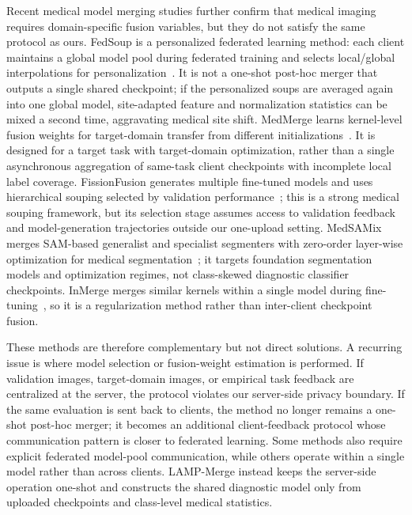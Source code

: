 Recent medical model merging studies further confirm that medical imaging requires domain-specific fusion variables, but they do not satisfy the same protocol as ours. FedSoup is a personalized federated learning method: each client maintains a global model pool during federated training and selects local/global interpolations for personalization~\cite{chen2023fedsoup}. It is not a one-shot post-hoc merger that outputs a single shared checkpoint; if the personalized soups are averaged again into one global model, site-adapted feature and normalization statistics can be mixed a second time, aggravating medical site shift. MedMerge learns kernel-level fusion weights for target-domain transfer from different initializations~\cite{almakky2024medmerge}. It is designed for a target task with target-domain optimization, rather than a single asynchronous aggregation of same-task client checkpoints with incomplete local label coverage. FissionFusion generates multiple fine-tuned models and uses hierarchical souping selected by validation performance~\cite{sanjeev2024fissionfusion}; this is a strong medical souping framework, but its selection stage assumes access to validation feedback and model-generation trajectories outside our one-upload setting. MedSAMix merges SAM-based generalist and specialist segmenters with zero-order layer-wise optimization for medical segmentation~\cite{yang2026medsamix}; it targets foundation segmentation models and optimization regimes, not class-skewed diagnostic classifier checkpoints. InMerge merges similar kernels within a single model during fine-tuning~\cite{wang2025inmerge}, so it is a regularization method rather than inter-client checkpoint fusion.

These methods are therefore complementary but not direct solutions. A recurring issue is where model selection or fusion-weight estimation is performed. If validation images, target-domain images, or empirical task feedback are centralized at the server, the protocol violates our server-side privacy boundary. If the same evaluation is sent back to clients, the method no longer remains a one-shot post-hoc merger; it becomes an additional client-feedback protocol whose communication pattern is closer to federated learning. Some methods also require explicit federated model-pool communication, while others operate within a single model rather than across clients. LAMP-Merge instead keeps the server-side operation one-shot and constructs the shared diagnostic model only from uploaded checkpoints and class-level medical statistics.

